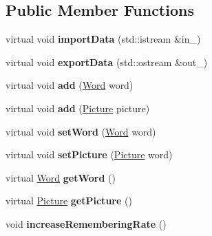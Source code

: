 \subsection*{Public Member Functions}
\begin{DoxyCompactItemize}
\item 
\mbox{\label{class_element_a1c5fd3029cf609e698695b10d3ba9c12}} 
virtual void {\bfseries import\+Data} (std\+::istream \&in\+\_\+)
\item 
\mbox{\label{class_element_aff9d7b31a7aaadafd99d9b3aa1ba1c59}} 
virtual void {\bfseries export\+Data} (std\+::ostream \&out\+\_\+)
\item 
\mbox{\label{class_element_acb6b4d4a1c3d5b294a1b63ff657d8c4e}} 
virtual void {\bfseries add} (\mbox{\hyperlink{class_word}{Word}} word)
\item 
\mbox{\label{class_element_a3b2abcbd0a44be55bff0e1d98bbc3f82}} 
virtual void {\bfseries add} (\mbox{\hyperlink{class_picture}{Picture}} picture)
\item 
\mbox{\label{class_element_a992c2fbf75165fcc41e448d73504252d}} 
virtual void {\bfseries set\+Word} (\mbox{\hyperlink{class_word}{Word}} word)
\item 
\mbox{\label{class_element_a4cf241aebdf462dda8aad30a4cc6b4d1}} 
virtual void {\bfseries set\+Picture} (\mbox{\hyperlink{class_picture}{Picture}} word)
\item 
\mbox{\label{class_element_ad9ad7d31a3b5f324665ca21d2324c618}} 
virtual \mbox{\hyperlink{class_word}{Word}} {\bfseries get\+Word} ()
\item 
\mbox{\label{class_element_a42ff5b608cea64b46e2e5b1cb21c6892}} 
virtual \mbox{\hyperlink{class_picture}{Picture}} {\bfseries get\+Picture} ()
\item 
\mbox{\label{class_element_ae74a9371bbbb6444e4b7d001dba56c90}} 
void {\bfseries increase\+Remembering\+Rate} ()
\item 
\mbox{\label{class_element_a9fca38b12a3c6bdda25785e4a34ad9bf}} 

\end{DoxyCompactItemize}
